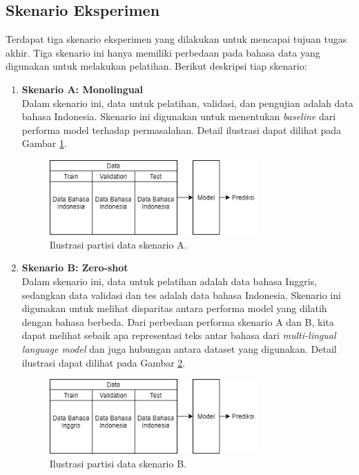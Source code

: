 	\subsection{Skenario Eksperimen}
	Terdapat tiga skenario eksperimen yang dilakukan untuk mencapai tujuan tugas akhir. Tiga skenario ini hanya memiliki perbedaan pada bahasa data yang digunakan untuk melakukan pelatihan. Berikut deskripsi tiap skenario:
	\begin{enumerate}
		\item \textbf{Skenario A: Monolingual}\\
		Dalam skenario ini, data untuk pelatihan, validasi, dan pengujian adalah data bahasa Indonesia. Skenario ini digunakan untuk menentukan \textit{baseline} dari performa model terhadap permasalahan. Detail ilustrasi dapat dilihat pada Gambar \ref{fig:data_tipe_a}.
		\begin{figure}[h]
		    \centering
		    \includegraphics[width=0.75\textwidth]{resources/Data-tipe-A.png}
		    \caption{Ilustrasi partisi data skenario A.}
		    \label{fig:data_tipe_a}
		\end{figure}

		\item \textbf{Skenario B: Zero-shot}\\
		Dalam skenario ini, data untuk pelatihan adalah data bahasa Inggris, sedangkan data validasi dan tes adalah data bahasa Indonesia. Skenario ini digunakan untuk melihat disparitas antara performa model yang dilatih dengan bahasa berbeda. Dari perbedaan performa skenario A dan B, kita dapat melihat sebaik apa representasi teks antar bahasa dari \textit{multi-lingual language model} dan juga hubungan antara dataset yang digunakan. Detail ilustrasi dapat dilihat pada Gambar \ref{fig:data_tipe_b}.
		\begin{figure}[h]
		    \centering
		    \includegraphics[width=0.75\textwidth]{resources/Data-tipe-B.png}
		    \caption{Ilustrasi partisi data skenario B.}
		    \label{fig:data_tipe_b}
		\end{figure}


\end{enumerate}
